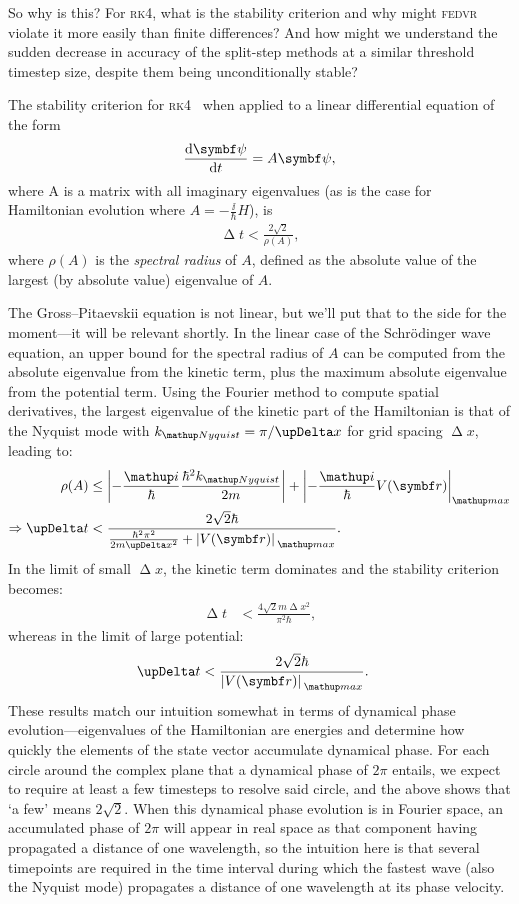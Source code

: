 So why is this? For \textsc{rk4}, what is the stability criterion and why might \textsc{fedvr} violate it more easily than finite differences? And how might we understand the sudden decrease in accuracy of the split-step methods at a similar threshold timestep size, despite them being unconditionally stable?

The stability criterion for \textsc{rk4}~\cite{caplan_numerical_2011} when applied to a linear differential equation of the form
\begin{align}
\dv{\vec\psi}{t} = A\vec\psi,
\end{align}
where A is a matrix with all imaginary eigenvalues (as is the case for Hamiltonian evolution where $A=-\frac \ii \hbar H$), is
\begin{align}
\upDelta t < \frac{2 \sqrt 2}{\rho(A)},
\end{align}
where $\rho(A)$ is the \emph{spectral radius} of $A$, defined as the absolute value of the largest (by absolute value) eigenvalue of $A$.

The Gross--Pitaevskii equation is not linear, but we'll put that to the side for the moment---it will be relevant shortly. In the linear case of the Schr\"odinger wave equation, an upper bound for the spectral radius of $A$ can be computed from the absolute eigenvalue from the kinetic term, plus the maximum absolute eigenvalue from the potential term. Using the Fourier method to compute spatial derivatives, the largest eigenvalue of the kinetic part of the Hamiltonian is that of the Nyquist mode with $k_\up{Nyquist} = \pi / \upDelta x$ for grid spacing $\upDelta x$, leading to:
\begin{align}
\rho(A) &\leq \Abs{-\frac \ii \hbar \frac{\hbar^2 k_\up{Nyquist}}{2m}}
+ \Abs{-\frac \ii \hbar V(\vec r)}_\up{max}\\
\Rightarrow \upDelta t &< \frac{2\sqrt 2 \hbar}
{\frac{\hbar^2\pi^2}{2m \upDelta x^2} + \abs{V(\vec r)}_\up{max}}.
\end{align}
In the limit of small $\upDelta x$, the kinetic term dominates and the stability criterion becomes:
\begin{align}\label{eq:rk4_kinetic_stability}
\upDelta t &< \frac{4\sqrt 2 m \upDelta x^2}{\pi^2 \hbar},
\end{align}
whereas in the limit of large potential:
\begin{align}
\upDelta t &< \frac{2\sqrt 2\hbar}{\abs{V(\vec r)}_\up{max}}.
\end{align}
These results match our intuition somewhat in terms of dynamical phase evolution---eigenvalues of the Hamiltonian are energies and determine how quickly the elements of the state vector accumulate dynamical phase. For each circle around the complex plane that a dynamical phase of $2\pi$ entails, we expect to require at least a few timesteps to resolve said circle, and the above shows that `a few' means $2\sqrt{2}$. When this dynamical phase evolution is in Fourier space, an accumulated phase of $2\pi$ will appear in real space as that component having propagated a distance of one wavelength, so the intuition here is that several timepoints are required in the time interval during which the fastest wave (also the Nyquist mode) propagates a distance of one wavelength at its phase velocity.

